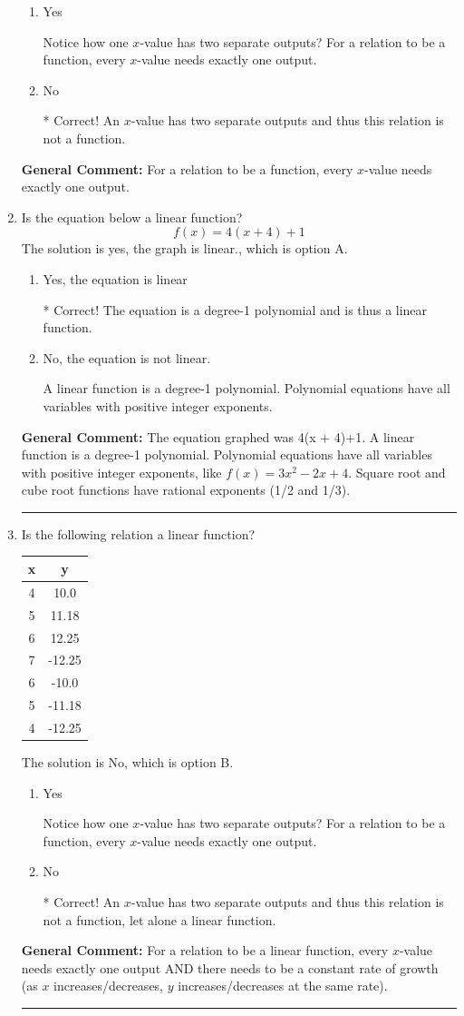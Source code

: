 \documentclass{extbook}[14pt]
\newcommand{\litem}[1]{\item #1

\rule{\textwidth}{0.4pt}}
\begin{document}
\begin{enumerate}
{\begin{enumerate}[label=\Alph*.]
\item Yes

Notice how one $x$-value has two separate outputs? For a relation to be a function, every $x$-value needs exactly one output.
\item No

* Correct! An $x$-value has two separate outputs and thus this relation is not a function.
\end{enumerate}


\textbf{General Comment:} For a relation to be a function, every $x$-value needs exactly one output.
}
\litem{
Is the equation below a linear function?
\[ f(x) = 4(x + 4)+1 \]The solution is yes, the graph is linear., which is option A.

\begin{enumerate}[label=\Alph*.]
\item Yes, the equation is linear

* Correct! The equation is a degree-1 polynomial and is thus a linear function.
\item No, the equation is not linear.

A linear function is a degree-1 polynomial. Polynomial equations have all variables with positive integer exponents.
\end{enumerate}


\textbf{General Comment:} The equation graphed was 4(x + 4)+1. A linear function is a degree-1 polynomial. Polynomial equations have all variables with positive integer exponents, like $f(x) = 3x^2-2x+4$. Square root and cube root functions have rational exponents (1/2 and 1/3).
}
\litem{
Is the following relation a linear function?


\begin{tabular}{c|c}
x &y\tabularnewline \hline
4 &10.0\tabularnewline \hline
5 &11.18\tabularnewline \hline
6 &12.25\tabularnewline \hline
7 &-12.25\tabularnewline \hline
6 &-10.0\tabularnewline \hline
5 &-11.18\tabularnewline \hline
4 &-12.25\end{tabular}The solution is No, which is option B.

\begin{enumerate}[label=\Alph*.]
\item Yes

Notice how one $x$-value has two separate outputs? For a relation to be a function, every $x$-value needs exactly one output.
\item No

* Correct! An $x$-value has two separate outputs and thus this relation is not a function, let alone a linear function.
\end{enumerate}


\textbf{General Comment:} For a relation to be a linear function, every $x$-value needs exactly one output AND there needs to be a constant rate of growth (as $x$ increases/decreases, $y$ increases/decreases at the same rate).
}
\end{enumerate}
\end{document}
